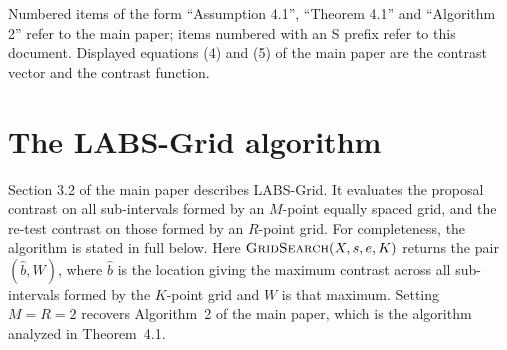 \documentclass[12pt, a4paper]{article}
\newcommand{\mainthm}{Theorem~4.1}
\newcommand{\proppop}{Proposition~4.1}
\newcommand{\algmain}{Algorithm~2}
\begin{document}
\begin{abstract}
This document supplements the main paper. Section~\ref{sup:grid} states the
LABS-Grid algorithm in full. Section~\ref{sup:toolkit} establishes the
properties of the contrast used in the consistency proof.
Section~\ref{sup:proof} proves \proppop{} and \mainthm{}.
Section~\ref{sup:gridtheory} extends the consistency result to LABS-Grid.
Section~\ref{sup:ssic} treats selection from a solution path by a
strengthened Schwarz criterion. Section~\ref{sup:lookahead} describes related
uses of look-ahead in other algorithmic settings.
\vspace{5pt}

 Binary segmentation, change-point detection, piecewise-linear signal, recursive algorithm, trend estimation.
\end{abstract}

Numbered items of the form ``Assumption 4.1'', ``Theorem 4.1'' and ``Algorithm 2'' refer to the main paper; items numbered with an S prefix refer to this document. Displayed equations (4) and (5) of the main paper are the contrast vector and the contrast function.
\section{The LABS-Grid algorithm}
\label{sup:grid}

Section 3.2 of the main paper describes LABS-Grid. It evaluates the proposal contrast on all sub-intervals formed by an $M$-point equally spaced grid, and the re-test contrast on those formed by an $R$-point grid. For completeness, the algorithm is stated in full below. Here $\textsc{GridSearch}(X,s,e,K)$ returns the pair $(\hat b,W)$, where $\hat b$ is the location giving the maximum contrast across all sub-intervals formed by the $K$-point grid and $W$ is that maximum. Setting $M=R=2$ recovers \algmain{} of the main paper, which is the algorithm analyzed in \mainthm{}.
\end{document}
